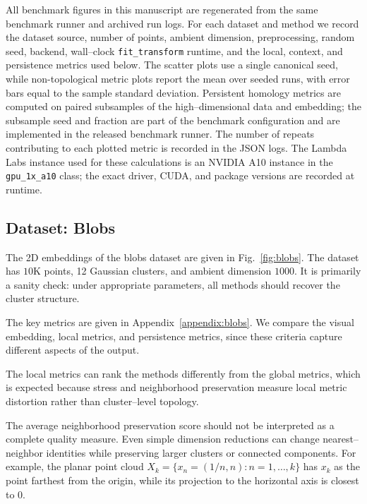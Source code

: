 \documentclass[11pt]{article}
\begin{document}
All benchmark figures in this manuscript are regenerated from the same benchmark runner and archived run logs. For each dataset and method we record the dataset source, number of points, ambient dimension, preprocessing, random seed, backend, wall--clock \texttt{fit\_transform} runtime, and the local, context, and persistence metrics used below. The scatter plots use a single canonical seed, while non-topological metric plots report the mean over seeded runs, with error bars equal to the sample standard deviation. Persistent homology metrics are computed on paired subsamples of the high--dimensional data and embedding; the subsample seed and fraction are part of the benchmark configuration and are implemented in the released benchmark runner. The number of repeats contributing to each plotted metric is recorded in the JSON logs. The Lambda Labs instance used for these calculations is an NVIDIA A10 instance in the \texttt{gpu\_1x\_a10} class; the exact driver, CUDA, and package versions are recorded at runtime.


\subsection{Dataset: Blobs}

The 2D embeddings of the blobs dataset are given in Fig.~\ref{fig:blobs}. The dataset has $10$K points, 12 Gaussian clusters, and ambient dimension $1000$. It is primarily a sanity check: under appropriate parameters, all methods should recover the cluster structure.

The key metrics are given in Appendix~\ref{appendix:blobs}. We compare the visual embedding, local metrics, and persistence metrics, since these criteria capture different aspects of the output.

The local metrics can rank the methods differently from the global metrics, which is expected because stress and neighborhood preservation measure local metric distortion rather than cluster--level topology.

The average neighborhood preservation score should not be interpreted as a complete quality measure. Even simple dimension reductions can change nearest--neighbor identities while preserving larger clusters or connected components. For example, the planar point cloud $X_k = \{x_n = (1/n, n) : n=1,\ldots,k\}$ has $x_k$ as the point farthest from the origin, while its projection to the horizontal axis is closest to $0$.
\end{document}
